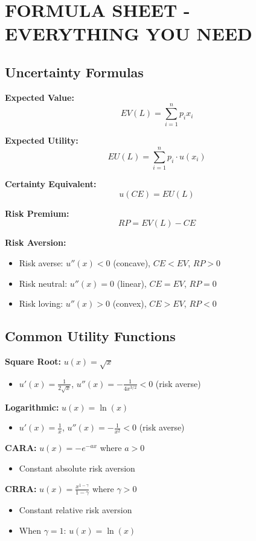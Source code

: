 \documentclass[10pt,letterpaper]{article}
\begin{document}
\newpage

\section{FORMULA SHEET - EVERYTHING YOU NEED}

\subsection{Uncertainty Formulas}

\begin{tcolorbox}[colback=formulacolor!5,colframe=formulacolor,title={\textbf{Expected Value \& Utility}}]
\textbf{Expected Value:}
\[
EV(L) = \sum_{i=1}^n p_i x_i
\]

\textbf{Expected Utility:}
\[
EU(L) = \sum_{i=1}^n p_i \cdot u(x_i)
\]

\textbf{Certainty Equivalent:}
\[
u(CE) = EU(L)
\]

\textbf{Risk Premium:}
\[
RP = EV(L) - CE
\]

\textbf{Risk Aversion:}
\begin{itemize}
  \item Risk averse: $u''(x) < 0$ (concave), $CE < EV$, $RP > 0$
  \item Risk neutral: $u''(x) = 0$ (linear), $CE = EV$, $RP = 0$
  \item Risk loving: $u''(x) > 0$ (convex), $CE > EV$, $RP < 0$
\end{itemize}
\end{tcolorbox}

\subsection{Common Utility Functions}

\begin{tcolorbox}[colback=formulacolor!5,colframe=formulacolor,title={\textbf{Utility Functions}}]
\textbf{Square Root:} $u(x) = \sqrt{x}$
\begin{itemize}
  \item $u'(x) = \frac{1}{2\sqrt{x}}$, $u''(x) = -\frac{1}{4x^{3/2}} < 0$ (risk averse)
\end{itemize}

\textbf{Logarithmic:} $u(x) = \ln(x)$
\begin{itemize}
  \item $u'(x) = \frac{1}{x}$, $u''(x) = -\frac{1}{x^2} < 0$ (risk averse)
\end{itemize}

\textbf{CARA:} $u(x) = -e^{-ax}$ where $a > 0$
\begin{itemize}
  \item Constant absolute risk aversion
\end{itemize}

\textbf{CRRA:} $u(x) = \frac{x^{1-\gamma}}{1-\gamma}$ where $\gamma > 0$
\begin{itemize}
  \item Constant relative risk aversion
  \item When $\gamma = 1$: $u(x) = \ln(x)$
\end{itemize}
\end{tcolorbox}
\end{document}
